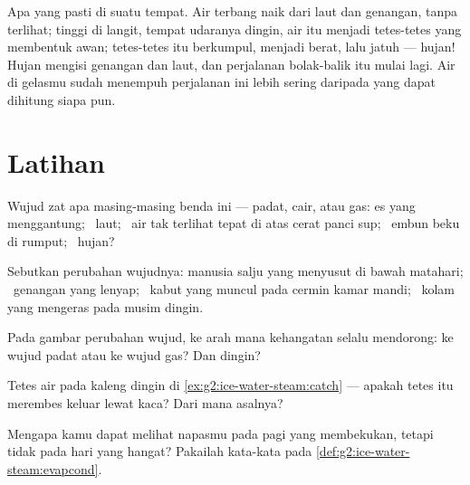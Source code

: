 \begin{example}\label{ex:g2:ice-water-steam:cycle}
Apa yang  pasti  di suatu tempat. Air terbang naik
dari laut dan genangan, tanpa terlihat; tinggi di langit, tempat
udaranya dingin, air itu  menjadi tetes-tetes yang membentuk
awan; tetes-tetes itu berkumpul, menjadi berat, lalu jatuh --- hujan!
Hujan mengisi genangan dan laut, dan perjalanan bolak-balik itu mulai
lagi. Air di gelasmu sudah menempuh perjalanan ini lebih sering
daripada yang dapat dihitung siapa pun.
\end{example}

\section{Latihan}

\begin{exercise}[$\star$]\label{exo:g2:ice-water-steam:1}
Wujud zat apa masing-masing benda ini --- padat, cair, atau gas: es
yang menggantung; \ laut; \ air tak terlihat tepat di atas cerat panci
sup; \ embun beku di rumput; \ hujan?
\end{exercise}

\begin{exercise}[$\star$]\label{exo:g2:ice-water-steam:2}
Sebutkan perubahan wujudnya: manusia salju yang menyusut di bawah
matahari; \ genangan yang lenyap; \ kabut yang muncul pada cermin kamar
mandi; \ kolam yang mengeras pada musim dingin.
\end{exercise}

\begin{exercise}[$\star$]\label{exo:g2:ice-water-steam:3}
Pada gambar perubahan wujud, ke arah mana kehangatan selalu
mendorong: ke wujud padat atau ke wujud gas? Dan dingin?
\end{exercise}

\begin{exercise}[$\star$]\label{exo:g2:ice-water-steam:4}
Tetes air pada kaleng dingin di \cref{ex:g2:ice-water-steam:catch} ---
apakah tetes itu merembes keluar lewat kaca? Dari mana asalnya?
\end{exercise}

\begin{exercise}[$\star$]\label{exo:g2:ice-water-steam:5}
Mengapa kamu dapat melihat napasmu pada pagi yang membekukan, tetapi
tidak pada hari yang hangat? Pakailah kata-kata pada
\cref{def:g2:ice-water-steam:evapcond}.
\end{exercise}

